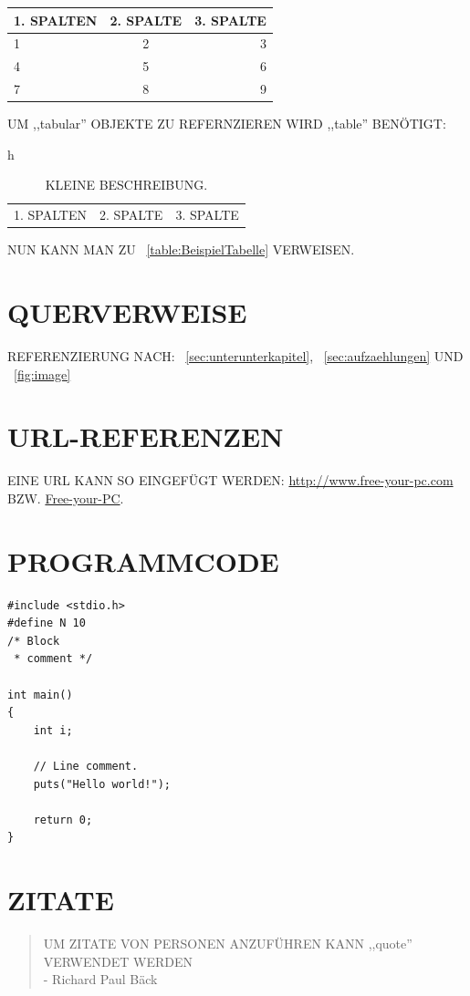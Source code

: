 \documentclass[conference,compsocl]{IEEEtran}
\begin{document}
\begin{tabular}{ | l || c r | }
  1. SPALTEN & 2. SPALTE & 3. SPALTE \\
  \hline %
  \hline %
  1 & 2 & 3 \\
  \hline %
  4 & 5 & 6 \\
  \hline %
  7 & 8 & 9 \\
\end{tabular}

UM ,,tabular'' OBJEKTE ZU REFERNZIEREN WIRD ,,table'' BENÖTIGT:
\begin{table}{h}
  \caption[GROSZE BESCHREIBUNG]{KLEINE BESCHREIBUNG.}
  \begin{tabular}{ | l || c r | }
  1. SPALTEN & 2. SPALTE & 3. SPALTE \\
  \end{tabular}
  \label{table:BeispielTabelle}
\end{table}
\FloatBarrier %

NUN KANN MAN ZU ~\autoref{table:BeispielTabelle} VERWEISEN.

\section{QUERVERWEISE}
REFERENZIERUNG NACH: ~\autoref{sec:unterunterkapitel},
~\autoref{sec:aufzaehlungen} UND ~\autoref{fig:image}

\section{URL-REFERENZEN}
EINE URL KANN SO EINGEFÜGT WERDEN: \url{http://www.free-your-pc.com}
BZW. \href{http://www.free-your-pc.com}{Free-your-PC}.

\section{PROGRAMMCODE}


\begin{lstlisting}
#include <stdio.h>
#define N 10
/* Block
 * comment */

int main()
{
    int i;

    // Line comment.
    puts("Hello world!");

    return 0;
}
\end{lstlisting}

\section{ZITATE}
\begin{quote}
  UM ZITATE VON PERSONEN ANZUFÜHREN KANN ,,quote'' VERWENDET WERDEN\\
  - Richard Paul Bäck
\end{quote}
\end{document}
